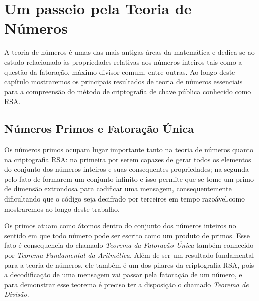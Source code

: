 \chapter {Um passeio pela Teoria de N\'umeros}
\label{Num}


\hspace{7mm}A teoria de n\'umeros \'e umas das mais antigas \'areas da matem\'atica e dedica-se ao estudo relacionado \`as propriedades relativas aos n\'umeros inteiros tais como a quest\~ao da fatora\c{c}\~ao, m\'aximo divisor comum, entre outras. Ao longo deste cap\'itulo mostraremos os principais resultados de teoria de n\'umeros essenciais para a compreens\~ao do m\'etodo de criptografia de chave p\'ublica conhecido como RSA.



\section{N\'umeros Primos e Fatora\c{c}\~ao \'Unica}

\hspace{7mm}Os n\'umeros primos ocupam lugar importante tanto na teoria de n\'umeros quanto na criptografia RSA: na primeira por serem capazes de gerar todos os elementos do conjunto dos n\'umeros inteiros e suas consequentes propriedades; na segunda pelo fato de formarem um conjunto infinito e isso permite que se tome um primo de dimens\~ao extrondosa para codificar uma mensagem, consequentemente dificultando que o c\'odigo seja decifrado por terceiros em tempo razo\'avel,como mostraremos ao longo deste trabalho.

Os primos atuam como \'atomos dentro do conjunto dos n\'umeros inteiros no sentido em que todo n\'umero pode ser escrito como um produto de primos. Esse fato \'e consequencia do chamado \textit{Teorema da Fatora\c{c}\~ao \'Unica} tamb\'em conhecido por \textit{Teorema Fundamental da Aritm\'etica}. Al\'em de ser um resultado fundamental para a teoria de n\'umeros, ele tamb\'em \'e um dos pilares da criptografia RSA, pois a decodifica\c{c}\~ao de uma mensagem vai passar pela fatora\c{c}\~ao de um n\'umero, e para demonstrar esse teorema \'e preciso ter a disposi\c{c}\~ao o chamado \textit{Teorema de Divis\~ao}. 



